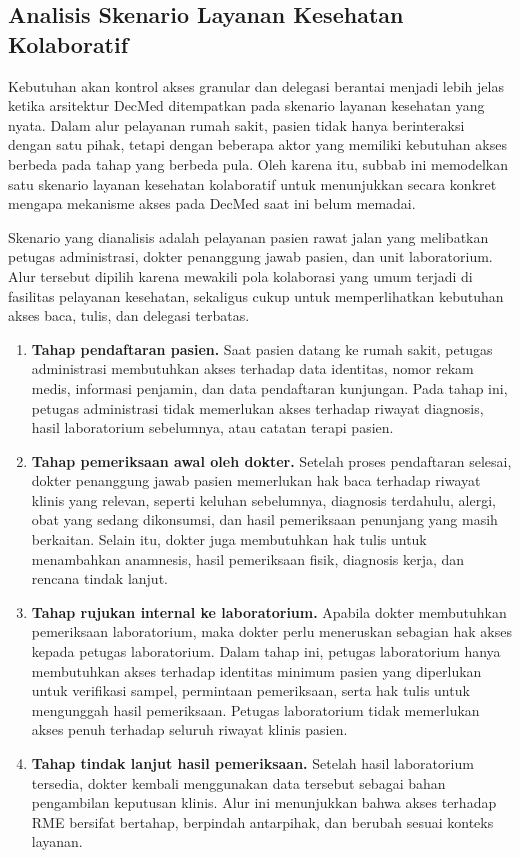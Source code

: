 \subsection{Analisis Skenario Layanan Kesehatan Kolaboratif}
\label{subsec:analisis-skenario-layanan-klinis}
Kebutuhan akan kontrol akses granular dan delegasi berantai menjadi lebih jelas ketika arsitektur DecMed ditempatkan pada skenario layanan kesehatan yang nyata. Dalam alur pelayanan rumah sakit, pasien tidak hanya berinteraksi dengan satu pihak, tetapi dengan beberapa aktor yang memiliki kebutuhan akses berbeda pada tahap yang berbeda pula. Oleh karena itu, subbab ini memodelkan satu skenario layanan kesehatan kolaboratif untuk menunjukkan secara konkret mengapa mekanisme akses pada DecMed saat ini belum memadai.

Skenario yang dianalisis adalah pelayanan pasien rawat jalan yang melibatkan petugas administrasi, dokter penanggung jawab pasien, dan unit laboratorium. Alur tersebut dipilih karena mewakili pola kolaborasi yang umum terjadi di fasilitas pelayanan kesehatan, sekaligus cukup untuk memperlihatkan kebutuhan akses baca, tulis, dan delegasi terbatas.

\begin{enumerate}[leftmargin=*]
	\item \textbf{Tahap pendaftaran pasien.} Saat pasien datang ke rumah sakit, petugas administrasi membutuhkan akses terhadap data identitas, nomor rekam medis, informasi penjamin, dan data pendaftaran kunjungan. Pada tahap ini, petugas administrasi tidak memerlukan akses terhadap riwayat diagnosis, hasil laboratorium sebelumnya, atau catatan terapi pasien.
	\item \textbf{Tahap pemeriksaan awal oleh dokter.} Setelah proses pendaftaran selesai, dokter penanggung jawab pasien memerlukan hak baca terhadap riwayat klinis yang relevan, seperti keluhan sebelumnya, diagnosis terdahulu, alergi, obat yang sedang dikonsumsi, dan hasil pemeriksaan penunjang yang masih berkaitan. Selain itu, dokter juga membutuhkan hak tulis untuk menambahkan anamnesis, hasil pemeriksaan fisik, diagnosis kerja, dan rencana tindak lanjut.
	\item \textbf{Tahap rujukan internal ke laboratorium.} Apabila dokter membutuhkan pemeriksaan laboratorium, maka dokter perlu meneruskan sebagian hak akses kepada petugas laboratorium. Dalam tahap ini, petugas laboratorium hanya membutuhkan akses terhadap identitas minimum pasien yang diperlukan untuk verifikasi sampel, permintaan pemeriksaan, serta hak tulis untuk mengunggah hasil pemeriksaan. Petugas laboratorium tidak memerlukan akses penuh terhadap seluruh riwayat klinis pasien.
	\item \textbf{Tahap tindak lanjut hasil pemeriksaan.} Setelah hasil laboratorium tersedia, dokter kembali menggunakan data tersebut sebagai bahan pengambilan keputusan klinis. Alur ini menunjukkan bahwa akses terhadap RME bersifat bertahap, berpindah antarpihak, dan berubah sesuai konteks layanan.
\end{enumerate}

